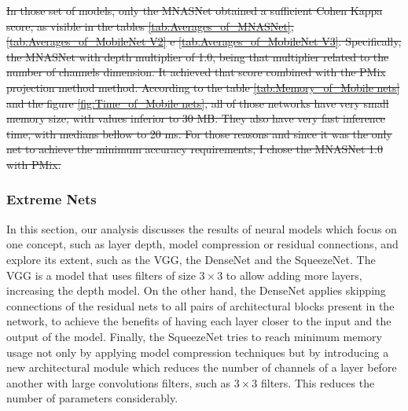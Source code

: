 \sout{
In those set of models, only the MNASNet obtained a sufficient Cohen Kappa score, as visible in the tables \ref{tab:Averages_of_MNASNet}, \ref{tab:Averages_of_MobileNet V2} e \ref{tab:Averages_of_MobileNet V3}. Specifically, the MNASNet with depth multiplier of 1.0, being that multiplier related to the number of channels dimension. It achieved that score combined with the \gls{PMix} projection method method. According to the table \ref{tab:Memory_of_Mobile nets} and the figure \ref{fig:Time_of_Mobile nets}, all of those networks have very small memory size, with values inferior to 30 MB. They also have very fast inference time, with medians bellow to 20 ms. For those reasons and since it was the only net to achieve the minimum accuracy requirements, I chose the MNASNet 1.0 with \gls{PMix}.
}






\FloatBarrier

\subsubsection{Extreme Nets}

In this section, our analysis discusses the results of neural models which focus on one concept, such as layer depth, model compression or residual connections, and explore its extent, such as the VGG, the DenseNet and the SqueezeNet. The VGG is a model that uses filters of size $3\times 3$ to allow adding more layers, increasing the depth model. On the other hand, the DenseNet applies skipping connections of the residual nets to all pairs of architectural blocks present in the network, to achieve the benefits of having each layer closer to the input and the output of the model. Finally, the SqueezeNet tries to reach minimum memory usage not only by applying model compression techniques but by introducing a new architectural module which reduces the number of channels of a layer before another with large convolutions filters, such as $3 \times 3$ filters. This reduces the number of parameters considerably.

